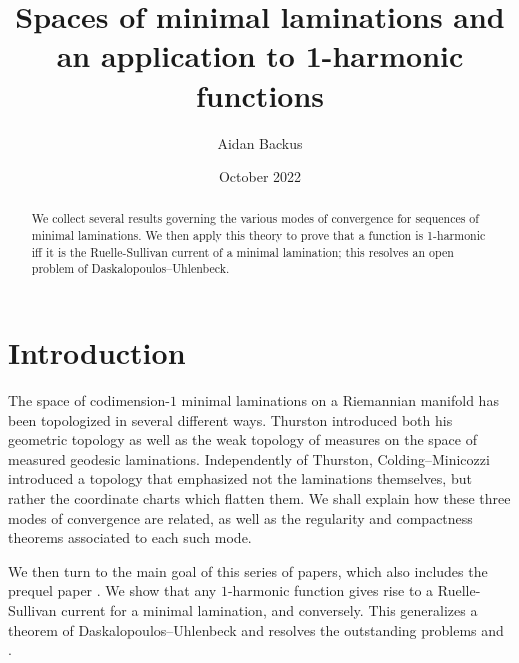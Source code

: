 \documentclass[reqno,11pt]{amsart}
\title{Spaces of minimal laminations and an application to 1-harmonic functions}
\author{Aidan Backus}
\date{October 2022}
\theoremstyle{definition}
\numberwithin{equation}{section}
\begin{document}
\begin{abstract}
We collect several results governing the various modes of convergence for sequences of minimal laminations.
We then apply this theory to prove that a function is 1-harmonic iff it is the Ruelle-Sullivan current of a minimal lamination; this resolves an open problem of Daskalopoulos--Uhlenbeck.
\end{abstract}

\maketitle



\section{Introduction}
The space of codimension-$1$ minimal laminations on a Riemannian manifold has been topologized in several different ways.
Thurston \cite[Chapter 8]{thurston1979geometry} introduced both his geometric topology as well as the weak topology of measures on the space of measured geodesic laminations.
Independently of Thurston, Colding--Minicozzi \cite[Appendix B]{ColdingMinicozziIV} introduced a topology that emphasized not the laminations themselves, but rather the coordinate charts which flatten them.
We shall explain how these three modes of convergence are related, as well as the regularity and compactness theorems associated to each such mode.

We then turn to the main goal of this series of papers, which also includes the prequel paper \cite{BackusFLG}.
We show that any $1$-harmonic function gives rise to a Ruelle-Sullivan current for a minimal lamination, and conversely.
This generalizes a theorem of Daskalopoulos--Uhlenbeck \cite[Theorem 6.1]{daskalopoulos2020transverse} and resolves the outstanding problems \cite[Problem 9.4]{daskalopoulos2020transverse} and \cite[Conjecture 9.5]{daskalopoulos2020transverse}.

\end{document}
